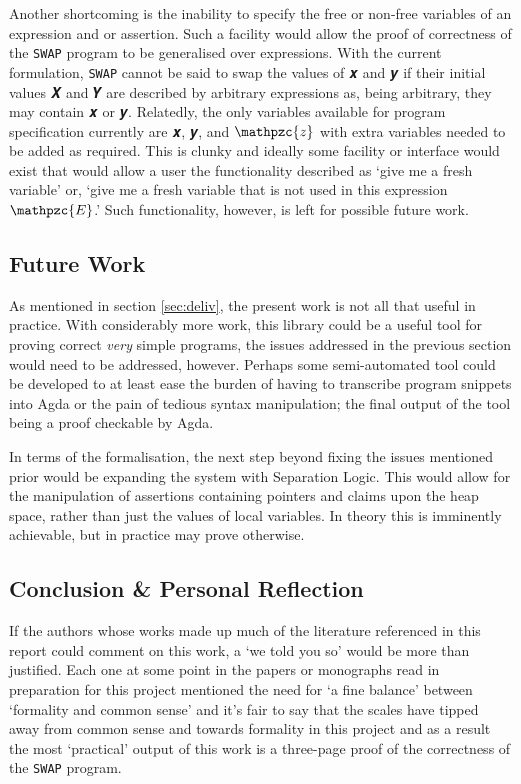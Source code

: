 \documentclass[oneside,12pt]{article}
\newcommand{\impcode}[1]{\textsc{\texttt{#1}}}
\newcommand{\codevar}[1]{\ensuremath{\mathpzc{#1}}}
\newcommand{\textM}[1]{\ensuremath{\mathpzc{#1}}}
\begin{document}
Another shortcoming is the inability to specify the free or non-free variables of an expression and or assertion. Such a facility would allow the proof of correctness of the \impcode{SWAP} program to be generalised over expressions. With the current formulation, \impcode{SWAP} cannot be said to swap the values of 𝒙 and 𝒚 if their initial values 𝑿 and 𝒀 are described by arbitrary expressions as, being arbitrary, they may contain 𝒙 or 𝒚. Relatedly, the only variables available for program specification currently are 𝒙, 𝒚, and \codevar{z} with extra variables needed to be added as required. This is clunky and ideally some facility or interface would exist that would allow a user the functionality described as `give me a fresh variable' or, `give me a fresh variable that is not used in this expression \textM{E}.' Such functionality, however, is left for possible future work.



\subsection{Future Work}

As mentioned in section \ref{sec:deliv}, the present work is not all that useful in practice. With considerably more work, this library could be a useful tool for proving correct \emph{very} simple programs, the issues addressed in the previous section would need to be addressed, however. Perhaps some semi-automated tool could be developed to at least ease the burden of having to transcribe program snippets into Agda or the pain of tedious syntax manipulation; the final output of the tool being a proof checkable by Agda.

In terms of the formalisation, the next step beyond fixing the issues mentioned prior would be expanding the system with Separation Logic. This would allow for the manipulation of assertions containing pointers and claims upon the heap space, rather than just the values of local variables. In theory this is imminently achievable, but in practice may prove otherwise.


\subsection{Conclusion \& Personal Reflection}


If the authors whose works made up much of the literature referenced in this report could comment on this work, a `we told you so' would be more than justified. Each one at some point in the papers or monographs read in preparation for this project mentioned the need for `a fine balance' between `formality and common sense' and it's fair to say that the scales have tipped away from common sense and towards formality in this project and as a result the most `practical' output of this work is a three-page proof of the correctness of the \impcode{SWAP} program.
\end{document}
